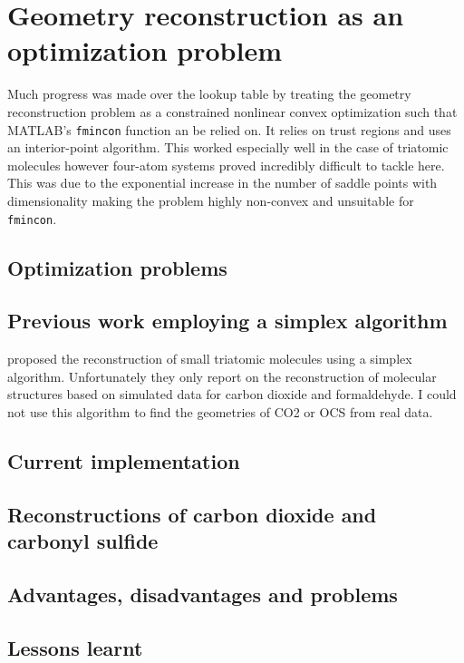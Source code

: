 \chapter{Geometry reconstruction as an optimization problem}\label{ch:optimization}

Much progress was made over the lookup table by treating the geometry reconstruction problem as a constrained nonlinear convex optimization such that MATLAB's \texttt{fmincon} function an be relied on. It relies on trust regions and uses an interior-point algorithm. This worked especially well in the case of triatomic molecules however four-atom systems proved incredibly difficult to tackle here. This was due to the exponential increase in the number of saddle points with dimensionality  making the problem highly non-convex and unsuitable for \texttt{fmincon}.

\section{Optimization problems}
\section{Previous work employing a simplex algorithm}
\citet{Brichta09} proposed the reconstruction of small triatomic molecules using a simplex algorithm. Unfortunately they only report on the reconstruction of molecular structures based on simulated data for carbon dioxide and formaldehyde. I could not use this algorithm to find the geometries of CO2 or OCS from real data.

\section{Current implementation}

\section{Reconstructions of carbon dioxide and carbonyl sulfide}

\section{Advantages, disadvantages and problems}

\section{Lessons learnt}